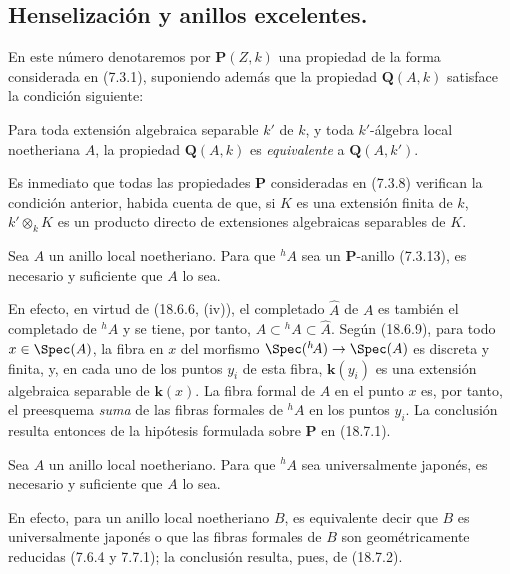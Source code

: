 \subsection{Henselización y anillos excelentes.}
\label{subsection:IV.18.7}

\begin{env}[18.7.1]
\label{IV.18.7.1}
En este número denotaremos por $\boldsymbol{P}(Z,k)$ una propiedad de la forma considerada en (7.3.1), suponiendo además que la propiedad $\boldsymbol{Q}(A,k)$ satisface la condición siguiente:

Para toda extensión algebraica separable $k'$ de $k$, y toda $k'$-álgebra local noetheriana $A$, la propiedad $\boldsymbol{Q}(A,k)$ es \emph{equivalente} a $\boldsymbol{Q}(A,k')$.

Es inmediato que todas las propiedades $\boldsymbol{P}$ consideradas en (7.3.8) verifican la condición anterior, habida cuenta de que, si $K$ es una extensión finita de $k$, $k'\otimes_k K$ es un producto directo de extensiones algebraicas separables de $K$.
\end{env}


\begin{proposition}[18.7.2]
\label{IV.18.7.2}
Sea $A$ un anillo local noetheriano. Para que ${}^h\!A$ sea un $\boldsymbol P$-anillo \textup{(7.3.13)}, es necesario y suficiente que $A$ lo sea.
\end{proposition}

En efecto, en virtud de (18.6.6, (iv)), el completado $\widehat A$ de $A$ es también el completado de ${}^h\!A$ y se tiene, por tanto, $A\subset{}^h\!A\subset\widehat A$. Según (18.6.9), para todo $x\in\Spec(A)$, la fibra en $x$ del morfismo $\Spec({}^h\!A)\to\Spec(A)$ es discreta y finita, y, en cada uno de los puntos $y_i$ de esta fibra, $\boldsymbol k(y_i)$ es una extensión algebraica separable de $\boldsymbol k(x)$. La fibra formal de $A$ en el punto $x$ es, por tanto, el preesquema \emph{suma} de las fibras formales de ${}^h\!A$ en los puntos $y_i$. La conclusión resulta entonces de la hipótesis formulada sobre $\boldsymbol P$ en (18.7.1).

\begin{corollary}[18.7.3]
\label{IV.18.7.3}
Sea $A$ un anillo local noetheriano. Para que ${}^h\!A$ sea universalmente japonés, es necesario y suficiente que $A$ lo sea.
\end{corollary}

En efecto, para un anillo local noetheriano $B$, es equivalente decir que $B$ es universalmente japonés o que las fibras formales de $B$ son geométricamente reducidas (7.6.4 y 7.7.1); la conclusión resulta, pues, de (18.7.2).

